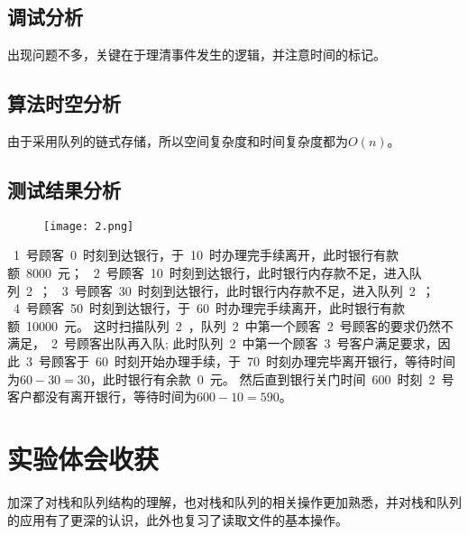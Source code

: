 \documentclass{ctexart}
\begin{document}
	\subsection{调试分析}
出现问题不多，关键在于理清事件发生的逻辑，并注意时间的标记。
	\subsection{算法时空分析}
由于采用队列的链式存储，所以空间复杂度和时间复杂度都为$O(n)$。
	\subsection{测试结果分析}
	\begin{figure}[H]
		\centering 
		\texttt{[image: 2.png]}
		\end{figure}
		~1~号顾客~0~时刻到达银行，于~10~时办理完手续离开，此时银行有款额~8000~元；
		~2~号顾客~10~时刻到达银行，此时银行内存款不足，进入队列~2~；
		~3~号顾客~30~时刻到达银行，此时银行内存款不足，进入队列~2~；
		~4~号顾客~50~时刻到达银行，于~60~时办理完手续离开，此时银行有款额~10000~元。
		这时扫描队列~2~，队列~2~中第一个顾客~2~号顾客的要求仍然不满足，~2~号顾客出队再入队;
		此时队列~2~中第一个顾客~3~号客户满足要求，因此~3~号顾客于~60~时刻开始办理手续，于~70~时刻办理完毕离开银行，等待时间为$60-30=30$，此时银行有余款~0~元。
		然后直到银行关门时间~600~时刻~2~号客户都没有离开银行，等待时间为$600-10=590$。
	\section{实验体会收获}
加深了对栈和队列结构的理解，也对栈和队列的相关操作更加熟悉，并对栈和队列的应用有了更深的认识，此外也复习了读取文件的基本操作。
\end{document}
